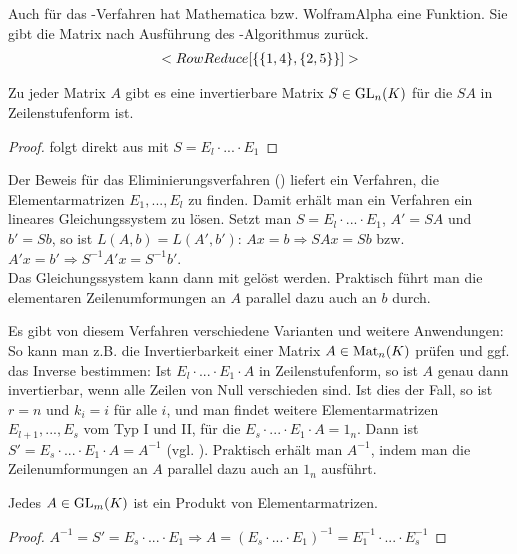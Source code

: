 \begin{mathematica}
	Auch für das -Verfahren hat Mathematica bzw. WolframAlpha eine Funktion. Sie gibt die Matrix nach Ausführung des -Algorithmus zurück.
	\begin{align}
		\texttt{RowReduce[\{\{1, 4\}, \{2, 5\}\}]}\notag
	\end{align}
\end{mathematica}

\begin{conclusion}
	Zu jeder Matrix $A$ gibt es eine invertierbare Matrix $S\in \GL_n(K)$ für die $SA$ in Zeilenstufenform ist.
\end{conclusion}
\begin{proof}
	folgt direkt aus  mit $S=E_l\cdot ... \cdot E_1$
\end{proof}

\begin{remark}
	Der Beweis für das Eliminierungsverfahren () liefert ein Verfahren, die Elementarmatrizen $E_1,...,E_l$ zu finden. 
	Damit erhält man ein Verfahren ein lineares Gleichungssystem zu lösen. Setzt man $S=E_l\cdot ... \cdot E_1$, $A'=SA$ und $b'=Sb$, so 
	ist $L(A,b)=L(A',b')$: $Ax=b\Rightarrow SAx=Sb$ bzw. $A'x=b' \Rightarrow S^{-1}A'x=S^{-1}b'$. \\
	Das Gleichungssystem kann dann mit  gelöst werden. Praktisch führt man die elementaren Zeilenumformungen an $A$ parallel dazu auch an $b$ 
	durch.
\end{remark}

\begin{remark}
	Es gibt von diesem Verfahren verschiedene Varianten und weitere Anwendungen: So kann man z.B. die Invertierbarkeit 
	einer Matrix $A\in \Mat_n(K)$ prüfen und ggf. das Inverse bestimmen: Ist $E_l\cdot ... \cdot E_1\cdot A$ in Zeilenstufenform, so ist $A$ 
	genau dann invertierbar, wenn alle Zeilen von Null verschieden sind. Ist dies der Fall, so ist $r=n$ und $k_i=i$ für alle $i$, 
	und man findet weitere Elementarmatrizen $E_{l+1},...,E_s$ vom Typ I und II, für die $E_s\cdot ... \cdot E_1\cdot A=1_n$. Dann ist 
	$S'=E_s\cdot ... \cdot E_1\cdot A=A^{-1}$ (vgl. ). Praktisch erhält man $A^{-1}$, indem man die Zeilenumformungen an $A$ parallel dazu 
	auch an $1_n$ ausführt.
\end{remark}

\begin{conclusion}
	Jedes $A\in \GL_m(K)$ ist ein Produkt von Elementarmatrizen.
\end{conclusion}
\begin{proof}
	$A^{-1}=S'=E_s\cdot ... \cdot E_1 \Rightarrow A=(E_s\cdot ... \cdot E_1)^{-1}=E_1^{-1}\cdot ... \cdot E_s^{-1}$
\end{proof}